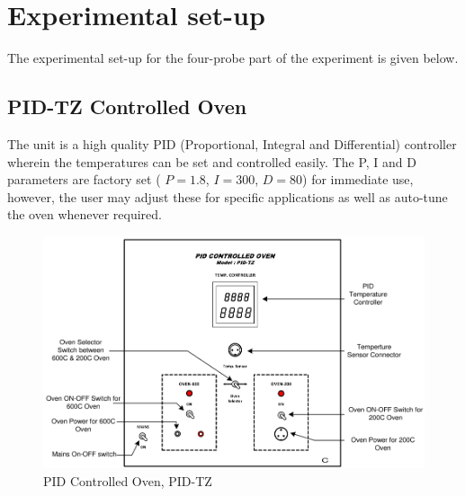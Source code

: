 \documentclass[%
 aip,
 amsmath,amssymb,
 reprint,%
]{revtex4-1}
\begin{document}
\section{Experimental set-up}
The experimental set-up for the four-probe part of the experiment is given below.
\subsection{PID-TZ Controlled Oven}
The unit is a high quality PID (Proportional, Integral and Differential) controller
wherein the temperatures can be set and controlled easily. The P, I and D parameters are
factory set ( $P = 1.8$, $I = 300$, $D = 80$) for immediate use, however, the user may adjust
these for specific applications as well as auto-tune the oven whenever required.
\begin{figure}
    \centering
    \includegraphics[scale = 0.8]{Figures/PID-TZ.png}
    \caption{PID Controlled Oven, PID-TZ}
    \label{fig:pid-tz}
\end{figure}
\end{document}
